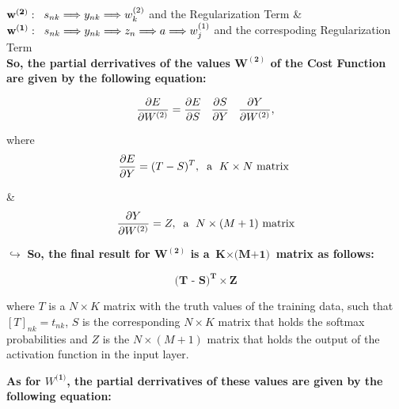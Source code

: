 \documentclass[11pt]{article}
\begin{document}
\noindent $\mathbf{w^{(2)}} : \hspace{2mm} s_{nk}  \Longrightarrow  {y}_{nk} \Longrightarrow {w}_k^{(2)}$ and the Regularization Term \& \\
$\mathbf{w^{(1)}} : \hspace{2mm} s_{nk} \Longrightarrow y_{nk} \Longrightarrow z_{n} \Longrightarrow a \Longrightarrow{w}_j^{(1)}$ and the correspoding Regularization Term \\

\noindent \textbf {So, the partial derrivatives of the values $\mathbf{W^{(2)}}$ of the Cost Function are given by the following equation:}

\begin{equation} \frac{\partial E}{\partial{W^{(2)}}} = \frac{\partial E}{\partial S} \hspace{3mm}  \frac{\partial S}{\partial Y} \hspace{3mm} \frac{\partial Y}{\partial W^{(2)}}, \end{equation}

\noindent where \begin{equation} \frac{\partial E}{\partial Y}  = (T - S)^T, \hspace{2mm} \text{a }\hspace{1mm}K \times N\text{ matrix } \end{equation} 
\begin{center} {\&} 
\begin{equation} \frac{\partial Y}{\partial W^{(2)}} = Z, \hspace{2mm}\text{a }\hspace{1mm} N \times (M+1)\text{ matrix} \end{equation} \end{center}

\noindent $ \hookrightarrow $ \textbf{So, the final result for $\mathbf{W^{(2)}}$ is a
$ \textbf{K} \times \textbf{(M+1)}$ matrix as follows:}

$$ 
\textbf{(T - S)}^\textbf{Τ} \times \textbf{Z}
$$

\noindent where $T$ is a $N \times K$ matrix with the truth values of the training data, such that $[T]_{nk} = t_{nk}$, $S$ is the corresponding $N \times K$ matrix that holds the softmax probabilities and $Z$ is the $N \times (M + 1)$ matrix that holds the output of the activation function in the input layer.
\newpage

\noindent \textbf{As for $W^{\textbf{(1)}}$, the partial derrivatives of these values are given by the following equation:} \\
\end{document}
